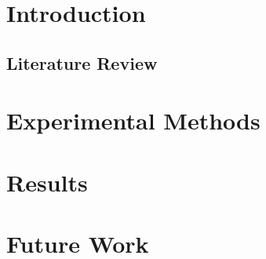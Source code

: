 \documentclass[a4paper,12pt,article,twoside,onecolumn,openany,draft]{memoir}
\begin{document}
\frontmatter




\tableofcontents*


\listoffigures


\listoftables

\mainmatter
\pagestyle{headings}
\chapter{Introduction}

\lipsum[1-5]

\section{Literature Review}
\lipsum[1-5]

\chapter{Experimental Methods}
\lipsum[1-5]

\chapter{Results}

\lipsum[1-5]

\chapter{Future Work}
\lipsum[1-5]
\end{document}
